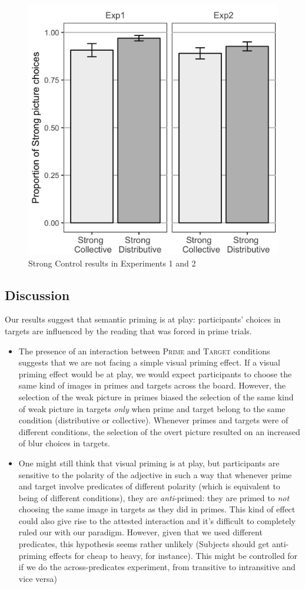 \documentclass[a4paper, 11pt]{article}
\newcommand{\addMM}[1]{{\leavevmode\color{red}#1}}
\begin{document}
\begin{figure}[h!]
  \centering
      \includegraphics[width=.5\textwidth]{Both-Controls.png}
         \caption{Strong Control results in Experiments 1 and 2}
        \label{fig:controls}
  \end{figure}


\subsection{Discussion}
Our results suggest that semantic priming is at play: participants' choices in targets are influenced by the reading that was forced in prime trials. 

\begin{itemize}

\item The presence of an interaction between \textsc{Prime} and \textsc{Target} conditions suggests that we are not facing a simple visual priming effect. If a visual priming effect would be at play, we would expect participants to choose the same kind of images in primes and targets across the board. 
However, the selection of the weak picture in primes biased the selection of the same kind of  weak picture in targets \emph{only} when prime and target belong to the same condition (distributive or collective). Whenever primes and targets were of different conditions, the selection of the overt picture resulted on an increased of blur choices in targets. 

\item One might still think that visual priming is at play, but participants are sensitive to the polarity of the adjective in such a way that whenever prime and target involve predicates of different polarity (which is equivalent to being of different conditions), they are \emph{anti}-primed: they are primed to \emph{not} choosing the same image in targets as they did in primes. This kind of effect could also give rise to the attested interaction and it's difficult to completely ruled our with our paradigm. 
However, given that we used different predicates, this hypothesis seems rather unlikely (\addMM{Subjects should get anti-priming effects for cheap to heavy, for instance}). 
\addMM{This might be controlled for if we do the across-predicates experiment, from transitive to intransitive and vice versa)}

\end{itemize}
\end{document}
